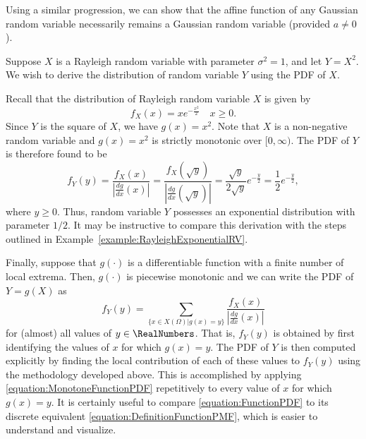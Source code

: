 Using a similar progression, we can show that the affine function of any Gaussian random variable necessarily remains a Gaussian random variable (provided $a \neq 0$).

\begin{example}
Suppose $X$ is a Rayleigh random variable with parameter $\sigma^2 = 1$, and let $Y = X^2$.
We wish to derive the distribution of random variable $Y$ using the PDF of $X$.

Recall that the distribution of Rayleigh random variable $X$ is given by
\begin{equation*}
f_X (x) = x e^{- \frac{x^2}{2} } \quad x \geq 0.
\end{equation*}
Since $Y$ is the square of $X$, we have $g(x) = x^2$.
Note that $X$ is a non-negative random variable and $g(x) = x^2$ is strictly monotonic over $[0, \infty)$.
The PDF of $Y$ is therefore found to be
\begin{equation*}
f_Y(y) = \frac{f_X (x)}{\left| \frac{dg}{dx}(x)\right|}
= \frac{f_X \left( \sqrt{y} \right)}{\left| \frac{dg}{dx} \left( \sqrt{y} \right) \right|}
= \frac{\sqrt{y}}{2 \sqrt{y}} e^{- \frac{y}{2} }
= \frac{1}{2} e^{- \frac{y}{2} } ,
\end{equation*}
where $y \geq 0$.
Thus, random variable $Y$ possesses an exponential distribution with parameter $1 / 2$.
It may be instructive to compare this derivation with the steps outlined in Example~\ref{example:RayleighExponentialRV}.
\end{example}

Finally, suppose that $g(\cdot)$ is a differentiable function with a finite number of local extrema.
Then, $g(\cdot)$ is piecewise monotonic and we can write the PDF of $Y= g(X)$ as
\begin{equation} \label{equation:FunctionPDF}
f_Y (y) = \sum_{ \{ x \in X(\Omega) | g(x) = y \} }
\frac{f_X (x)}{\left| \frac{dg}{dx}(x) \right|}
\end{equation}
for (almost) all values of $y \in \RealNumbers$.
That is, $f_Y (y)$ is obtained by first identifying the values of $x$ for which $g(x) = y$.
The PDF of $Y$ is then computed explicitly by finding the local contribution of each of these values to $f_Y(y)$ using the methodology developed above.
This is accomplished by applying \eqref{equation:MonotoneFunctionPDF} repetitively to every value of $x$ for which $g(x) = y$.
It is certainly useful to compare \eqref{equation:FunctionPDF} to its discrete equivalent \eqref{equation:DefinitionFunctionPMF}, which is easier to understand and visualize.

